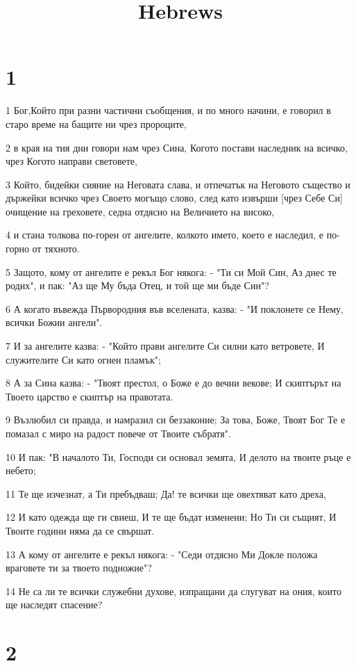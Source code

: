 

\title{Hebrews}


\chapter{1}

\par 1 Бог,Който при разни частични съобщения, и по много начини, е говорил в старо време на бащите ни чрез пророците,
\par 2 в края на тия дни говори нам чрез Сина, Когото постави наследник на всичко, чрез Когото направи световете,
\par 3 Който, бидейки сияние на Неговата слава, и отпечатък на Неговото същество и държейки всичко чрез Своето могъщо слово, след като извърши [чрез Себе Си] очищение на греховете, седна отдясно на Величието на високо,
\par 4 и стана толкова по-горен от ангелите, колкото името, което е наследил, е по-горно от тяхното.
\par 5 Защото, кому от ангелите е рекъл Бог някога: - "Ти си Мой Син, Аз днес те родих", и пак: "Аз ще Му бъда Отец, и той ще ми бъде Син"?
\par 6 А когато въвежда Първородния във вселената, казва: - "И поклонете се Нему, всички Божии ангели".
\par 7 И за ангелите казва: - "Който прави ангелите Си силни като ветровете, И служителите Си като огнен пламък";
\par 8 А за Сина казва: - "Твоят престол, о Боже е до вечни векове; И скиптърът на Твоето царство е скиптър на правотата.
\par 9 Възлюбил си правда, и намразил си беззаконие; За това, Боже, Твоят Бог Те е помазал с миро на радост повече от Твоите събратя".
\par 10 И пак: "В началото Ти, Господи си основал земята, И делото на твоите ръце е небето;
\par 11 Те ще изчезнат, а Ти пребъдваш; Да! те всички ще овехтяват като дреха,
\par 12 И като одежда ще ги свиеш, И те ще бъдат изменени; Но Ти си същият, И Твоите години няма да се свършат.
\par 13 А кому от ангелите е рекъл някога: - "Седи отдясно Ми Докле положа враговете ти за твоето подножие"?
\par 14 Не са ли те всички служебни духове, изпращани да слугуват на ония, които ще наследят спасение?

\chapter{2}


